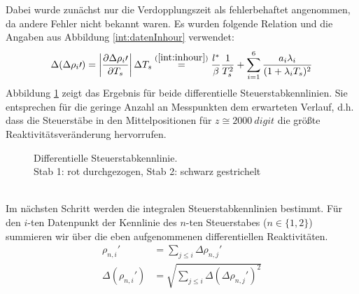     Dabei wurde zunächst nur die Verdopplungszeit als fehlerbehaftet angenommen, da andere Fehler nicht bekannt waren. Es wurden folgende Relation und die Angaben aus Abbildung \ref{int:datenInhour} verwendet:
    	\begin{equation}
    		\Delta(\Delta\rho_i\prime) = \left\vert\frac{\partial\Delta\rho_i\prime}{\partial T_s}\right\vert\Delta T_s \overset{(\ref{int:inhour})}{=} 
    		\frac{l^*}{\beta}\frac{1}{T_s^2}+\sum_{i = 1}^{6}  \frac{a_i \lambda_i}{(1+\lambda_i T_s)^2}
    	\end{equation}
    Abbildung \ref{exp:diffSSKL} zeigt das Ergebnis für beide differentielle Steuerstabkennlinien. Sie entsprechen für die geringe Anzahl an Messpunkten dem erwarteten Verlauf, d.h. dass die Steuerstäbe in den Mittelpositionen für $z \cong 2000\ \unit{digit}$ die größte Reaktivitätsveränderung hervorrufen.
		\begin{figure}[hp]
				\centering
				\captionsetup{justification=centering}
				\scalebox{0.6}{
					
				}
				\caption{Differentielle Steuerstabkennlinie. \\
				Stab 1: rot durchgezogen, Stab 2: schwarz gestrichelt}
				\label{exp:diffSSKL}
		\end{figure}
		\ \\
		Im nächsten Schritt werden die integralen Steuerstabkennlinien bestimmt. Für den $i$-ten Datenpunkt der Kennlinie des $n$-ten Steuerstabes ($n \in \{1,2\}$) summieren wir über die eben aufgenommenen differentiellen Reaktivitäten.
			\begin{align}
				\rho_{n,i}\prime &= \sum_{j \leq i} \Delta \rho_{n,j}\prime\\
				\Delta(\rho_{n,i}\prime) &= \sqrt{\sum_{j \leq i} \Delta(\Delta \rho_{n,j}\prime)^2}
			\end{align}
		
